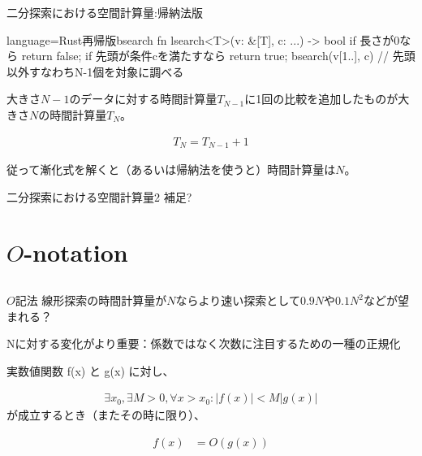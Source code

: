 \documentclass{beamer}
\begin{document}
\begin{frame}[fragile]{二分探索における空間計算量:帰納法版}{}

\begin{codeof}{language=Rust}{再帰版bsearch}
fn lsearch<T>(v: &[T], c: ...) -> bool {
   if 長さが0なら { return false; } 
   if 先頭が条件cを満たすなら { return true; }
   bsearch(v[1..], c) // 先頭以外すなわちN-1個を対象に調べる
}
\end{codeof}

大きさ$N-1$のデータに対する時間計算量$T_{N-1}$に1回の比較を追加したものが大きさ$N$の時間計算量$T_{N}$。

\begin{align*}
T_{N} = T_{N-1} + 1
\end{align*}

従って漸化式を解くと（あるいは帰納法を使うと）時間計算量は$N$。
\end{frame}

\begin{frame}[fragile]{二分探索における空間計算量2}{}
補足?
\end{frame}

\section{$O$-notation}		%
\subsection{}

\begin{frame}[fragile]{$O$記法}{}
線形探索の時間計算量が$N$ならより速い探索として$0.9N$や$0.1N^2$などが望まれる？

Nに対する変化がより重要：係数ではなく次数に注目するための一種の正規化

\vfill
実数値関数 f(x) と g(x) に対し、

\begin{align*}
\exists x_{0}, \exists M > 0,  \forall x > x_{0} : |f(x)| < M | g(x) |
\end{align*}
が成立するとき（またその時に限り）、

\begin{align*}
f(x) &= O(g(x))
\end{align*}
\end{frame}
\end{document}
